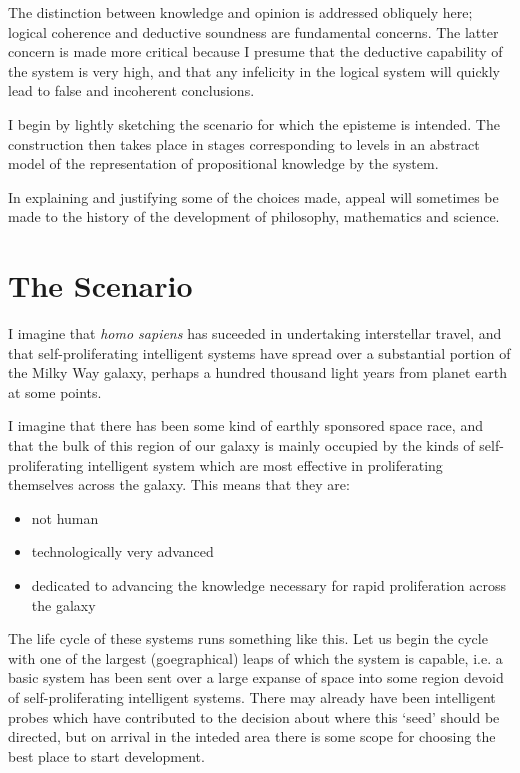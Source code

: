 \documentclass[10pt,titlepage]{book}
\begin{document}
The distinction between knowledge and opinion is addressed obliquely here; logical coherence and deductive soundness are fundamental concerns.
The latter concern is made more critical because I presume that the deductive capability of the system is very high, and that any infelicity in the logical system will quickly lead to false and incoherent conclusions.

I begin by lightly sketching the scenario for which the episteme is intended.
The construction then takes place in stages corresponding to levels in an abstract model of the representation of propositional knowledge by the system.

In explaining and justifying some of the choices made, appeal will sometimes be made to the history of the development of philosophy, mathematics and science.

\section{The Scenario}

I imagine that \emph{homo sapiens} has suceeded in undertaking interstellar travel, and that self-proliferating intelligent systems have spread over a substantial portion of the Milky Way galaxy, perhaps a hundred thousand light years from planet earth at some points.

I imagine that there has been some kind of earthly sponsored space race, and that the bulk of this region of our galaxy is mainly occupied by the kinds of self-proliferating intelligent system which are most effective in proliferating themselves across the galaxy.
This means that they are:
\begin{itemize}
\item not human
\item technologically very advanced
\item dedicated to advancing the knowledge necessary for rapid proliferation across the galaxy
\end{itemize}

The life cycle of these systems runs something like this.
Let us begin the cycle with one of the largest (goegraphical) leaps of which the system is capable, i.e. a basic system has been sent over a large expanse of space into some region devoid of self-proliferating intelligent systems.
There may already have been intelligent probes which have contributed to the decision about where this `seed' should be directed, but on arrival in the inteded area there is some scope for choosing the best place to start development.
\end{document}

